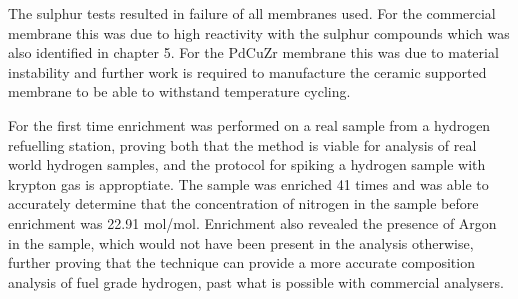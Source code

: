 The sulphur tests resulted in failure of all membranes used. For the commercial membrane this was due to high reactivity with the sulphur compounds which was also identified in chapter 5. For the PdCuZr membrane this was due to material instability and further work is required to manufacture the ceramic supported membrane to be able to withstand temperature cycling. 

For the first time enrichment was performed on a real sample from a hydrogen refuelling station, proving both that the method is viable for analysis of real world hydrogen samples, and the protocol for spiking a hydrogen sample with krypton gas is approptiate. The sample was enriched 41 times and was able to accurately determine that the concentration of nitrogen in the sample before enrichment was 22.91 \textmu mol/mol. Enrichment also revealed the presence of Argon in the sample, which would not have been present in the analysis otherwise, further proving that the technique can provide a more accurate composition analysis of fuel grade hydrogen, past what is possible with commercial analysers.
